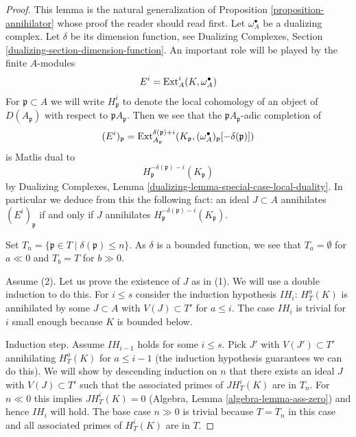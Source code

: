 \begin{proof}
This lemma is the natural generalization of
Proposition \ref{proposition-annihilator}
whose proof the reader should read first.
Let $\omega_A^\bullet$ be a dualizing complex. Let $\delta$ be its
dimension function, see Dualizing Complexes, Section
\ref{dualizing-section-dimension-function}.
An important role will be played by the finite $A$-modules
$$
E^i = \mathop{\mathrm{Ext}}\nolimits_A^i(K, \omega_A^\bullet)
$$
For $\mathfrak p \subset A$ we will write $H^i_\mathfrak p$ to denote the
local cohomology of an object of $D(A_\mathfrak p)$ with respect to
$\mathfrak pA_\mathfrak p$. Then we see that
the $\mathfrak pA_\mathfrak p$-adic completion of
$$
(E^i)_\mathfrak p =
\mathop{\mathrm{Ext}}\nolimits^{\delta(\mathfrak p) + i}_{A_\mathfrak p}(K_\mathfrak p,
(\omega_A^\bullet)_\mathfrak p[-\delta(\mathfrak p)])
$$
is Matlis dual to
$$
H^{-\delta(\mathfrak p) - i}_{\mathfrak p}(K_\mathfrak p)
$$
by
Dualizing Complexes, Lemma \ref{dualizing-lemma-special-case-local-duality}.
In particular we deduce from this the
following fact: an ideal $J \subset A$ annihilates
$(E^i)_\mathfrak p$ if and only if $J$ annihilates
$H^{-\delta(\mathfrak p) - i}_{\mathfrak p}(K_\mathfrak p)$.

\medskip\noindent
Set $T_n = \{\mathfrak p \in T \mid \delta(\mathfrak p) \leq n\}$.
As $\delta$ is a bounded function, we see that
$T_a = \emptyset$ for $a \ll 0$ and $T_b = T$ for $b \gg 0$.

\medskip\noindent
Assume (2). Let us prove the existence of $J$ as in (1).
We will use a double induction to do this. For $i \leq s$
consider the induction hypothesis $IH_i$:
$H^a_T(K)$ is annihilated by some $J \subset A$ with $V(J) \subset T'$
for $a \leq i$. The case $IH_i$ is trivial for $i$ small
enough because $K$ is bounded below.

\medskip\noindent
Induction step. Assume $IH_{i - 1}$ holds for some $i \leq s$.
Pick $J'$ with $V(J') \subset T'$ annihilating $H^a_T(K)$ for
$a \leq i - 1$ (the induction hypothesis guarantees we can
do this). We will show by descending induction on $n$
that there exists an ideal $J$ with $V(J) \subset T'$ such that the
associated primes of $J H^i_T(K)$ are in $T_n$.
For $n \ll 0$ this implies $JH^i_T(K) = 0$ 
(Algebra, Lemma \ref{algebra-lemma-ass-zero})
and hence $IH_i$ will hold.
The base case $n \gg 0$ is trivial because $T = T_n$ in this case
and all associated primes of $H^i_T(K)$ are in $T$.


\end{proof}
